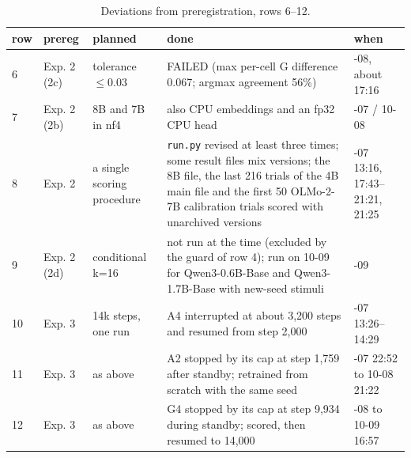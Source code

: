 \documentclass[11pt]{article}
\begin{document}
\begin{table}[tbp]
\centering
\small
\caption{Deviations from preregistration, rows 6--12.}\label{tab:app-dev-2}
\begin{tabularx}{\linewidth}{@{}l>{\raggedright\arraybackslash\hsize=0.3482\hsize}X>{\raggedright\arraybackslash\hsize=0.6053\hsize}X>{\raggedright\arraybackslash\hsize=2.3897\hsize}X>{\raggedright\arraybackslash\hsize=0.6568\hsize}X@{}}
\toprule
row & prereg & planned & done & when \\
\midrule
6 & Exp. 2 (2c) & tolerance $\leq 0.03$ & FAILED (max per-cell G difference 0.067; argmax agreement 56\%) & 10-08, about 17:16 \\
7 & Exp. 2 (2b) & 8B and 7B in nf4 & also CPU embeddings and an fp32 CPU head & 10-07 / 10-08 \\
8 & Exp. 2 & a single scoring procedure & \texttt{run.py} revised at least three times; some result files mix versions; the 8B file, the last 216 trials of the 4B main file and the first 50 OLMo-2-7B calibration trials scored with unarchived versions & 10-07 13:16, 17:43--21:21, 21:25 \\
9 & Exp. 2 (2d) & conditional k=16 & not run at the time (excluded by the guard of row 4); run on 10-09 for Qwen3-0.6B-Base and Qwen3-1.7B-Base with new-seed stimuli & 10-09 \\
10 & Exp. 3 & 14k steps, one run & A4 interrupted at about 3,200 steps and resumed from step 2,000 & 10-07 13:26--14:29 \\
11 & Exp. 3 & as above & A2 stopped by its cap at step 1,759 after standby; retrained from scratch with the same seed & 10-07 22:52 to 10-08 21:22 \\
12 & Exp. 3 & as above & G4 stopped by its cap at step 9,934 during standby; scored, then resumed to 14,000 & 10-08 to 10-09 16:57 \\
\bottomrule
\end{tabularx}
\end{table}
\end{document}
